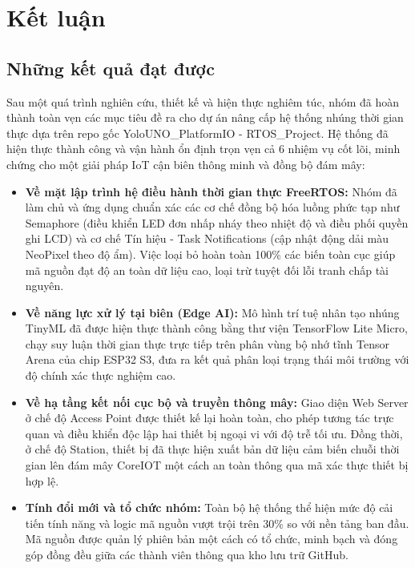 \section{Kết luận}

\subsection{Những kết quả đạt được}
Sau một quá trình nghiên cứu, thiết kế và hiện thực nghiêm túc, nhóm đã hoàn thành toàn vẹn các mục tiêu đề ra cho dự án nâng cấp hệ thống nhúng thời gian thực dựa trên repo gốc YoloUNO\_PlatformIO - RTOS\_Project. Hệ thống đã hiện thực thành công và vận hành ổn định trọn vẹn cả 6 nhiệm vụ cốt lõi, minh chứng cho một giải pháp IoT cận biên thông minh và đồng bộ đám mây:
\begin{itemize}
    \item \textbf{Về mặt lập trình hệ điều hành thời gian thực FreeRTOS:} Nhóm đã làm chủ và ứng dụng chuẩn xác các cơ chế đồng bộ hóa luồng phức tạp như Semaphore (điều khiển LED đơn nhấp nháy theo nhiệt độ và điều phối quyền ghi LCD) và cơ chế Tín hiệu - Task Notifications (cập nhật động dải màu NeoPixel theo độ ẩm). Việc loại bỏ hoàn toàn 100\% các biến toàn cục giúp mã nguồn đạt độ an toàn dữ liệu cao, loại trừ tuyệt đối lỗi tranh chấp tài nguyên.
    \item \textbf{Về năng lực xử lý tại biên (Edge AI):} Mô hình trí tuệ nhân tạo nhúng TinyML đã được hiện thực thành công bằng thư viện TensorFlow Lite Micro, chạy suy luận thời gian thực trực tiếp trên phân vùng bộ nhớ tĩnh Tensor Arena của chip ESP32 S3, đưa ra kết quả phân loại trạng thái môi trường với độ chính xác thực nghiệm cao.
    \item \textbf{Về hạ tầng kết nối cục bộ và truyền thông mây:} Giao diện Web Server ở chế độ Access Point được thiết kế lại hoàn toàn, cho phép tương tác trực quan và điều khiển độc lập hai thiết bị ngoại vi với độ trễ tối ưu. Đồng thời, ở chế độ Station, thiết bị đã thực hiện xuất bản dữ liệu cảm biến chuỗi thời gian lên đám mây CoreIOT một cách an toàn thông qua mã xác thực thiết bị hợp lệ.
    \item \textbf{Tính đổi mới và tổ chức nhóm:} Toàn bộ hệ thống thể hiện mức độ cải tiến tính năng và logic mã nguồn vượt trội trên 30\% so với nền tảng ban đầu. Mã nguồn được quản lý phiên bản một cách có tổ chức, minh bạch và đóng góp đồng đều giữa các thành viên thông qua kho lưu trữ GitHub.
\end{itemize}

